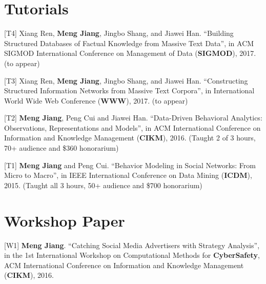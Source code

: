 \documentclass[margin, 10pt]{res}
\begin{document}
\begin{resume}

\section{Tutorials}

[T4] Xiang Ren, \textbf{Meng Jiang}, Jingbo Shang, and Jiawei Han. ``Building Structured Databases of Factual Knowledge from Massive Text Data'', in ACM SIGMOD International Conference on Management of Data (\textbf{SIGMOD}), 2017. (to appear)

[T3] Xiang Ren, \textbf{Meng Jiang}, Jingbo Shang, and Jiawei Han. ``Constructing Structured Information Networks from Massive Text Corpora'', in International World Wide Web Conference (\textbf{WWW}), 2017. (to appear)

[T2] \textbf{Meng Jiang}, Peng Cui and Jiawei Han. ``Data-Driven Behavioral Analytics: Observations, Representations and Models'', in ACM International Conference on Information and Knowledge Management (\textbf{CIKM}), 2016. (Taught 2 of 3 hours, 70+ audience and \$360 honorarium)

[T1] \textbf{Meng Jiang} and Peng Cui. ``Behavior Modeling in Social Networks: From Micro to Macro'', in IEEE International Conference on Data Mining (\textbf{ICDM}), 2015. (Taught all 3 hours, 50+ audience and \$700 honorarium)


\section{Workshop Paper}

[W1] \textbf{Meng Jiang}. ``Catching Social Media Advertisers with Strategy Analysis'', in the 1st International Workshop on Computational Methods for \textbf{CyberSafety}, ACM International Conference on Information and Knowledge Management (\textbf{CIKM}), 2016.



\end{resume}
\end{document}
